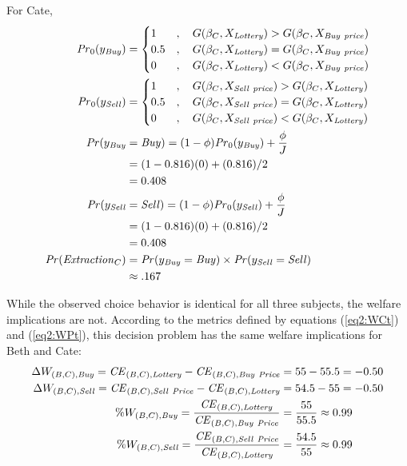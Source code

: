 \documentclass[../main.tex]{subfiles}
\begin{document}
\noindent For Cate,
\begin{align}
	\label{eq2:Cate}
	\begin{split}
		{\ensuremath{\mathit{Pr}}}_0(y_{\mathit{Buy}}) &=
		\begin{cases}
			1 &, \quad G(\beta_C,X_{\mathit{Lottery}}) > G(\beta_C,X_{\mathit{Buy\ price}})\\
			0.5 &, \quad G(\beta_C,X_{\mathit{Lottery}}) = G(\beta_C,X_{\mathit{Buy\ price}})\\
			0 &, \quad G(\beta_C,X_{\mathit{Lottery}}) < G(\beta_C,X_{\mathit{Buy\ price}})
		\end{cases} \\
		{\mathit{Pr}}_0(y_{\mathit{Sell}}) &=
		\begin{cases}
			1 &, \quad G(\beta_C,X_{\mathit{Sell\ price}}) > G(\beta_C,X_{\mathit{Lottery}})\\
			0.5 &, \quad G(\beta_C,X_{\mathit{Sell\ price}}) = G(\beta_C,X_{\mathit{Lottery}})\\
			0 &, \quad G(\beta_C,X_{\mathit{Sell\ price}}) < G(\beta_C,X_{\mathit{Lottery}})
		\end{cases}\\
		{\mathit{Pr}}(y_{\mathit{Buy}}&=\mathit{Buy}) = (1-\phi) {\mathit{Pr}}_0(y_{\mathit{Buy}}) + \frac{\phi}{J}\\
		&=(1-0.816)(0) + (0.816)/2\\
		&=0.408\\
		{\mathit{Pr}}(y_{\mathit{Sell}}&=\mathit{Sell}) = (1-\phi) {\mathit{Pr}}_0(y_{\mathit{Sell}}) + \frac{\phi}{J}\\
		&=(1-0.816)(0) + (0.816)/2\\
		&=0.408\\
	{\mathit{Pr}}(\mathit{Extraction}_C) &= {\mathit{Pr}}(y_{\mathit{Buy}} = \mathit{Buy}) \times {\ensuremath{\mathit{Pr}}}(y_{\mathit{Sell}} = \mathit{Sell})\\
	&\approx .167
	\end{split}
\end{align}

While the observed choice behavior is identical for all three subjects, the welfare implications are not.
According to the metrics defined by equations (\ref{eq2:WCt}) and (\ref{eq2:WPt}), this decision problem has the same welfare implications for Beth and Cate:
\begin{align}
	\label{eq2:BCwelfare}
	\begin{split}
		\Delta W_{(B,C),\mathit{Buy}} = {\mathit{CE}}_{(B,C),\mathit{Lottery}} - {\mathit{CE}}_{(B,C),\mathit{Buy\ Price}} &= 55 - 55.5 = -0.50\\
		\Delta W_{(B,C),\mathit{Sell}} = {\mathit{CE}}_{(B,C),\mathit{Sell\ Price}} - {\mathit{CE}}_{(B,C),\mathit{Lottery}} &= 54.5 - 55 = -0.50\\
		\% W_{(B,C),\mathit{Buy}} = \frac{{\mathit{CE}}_{(B,C),\mathit{Lottery}}}{{\mathit{CE}}_{(B,C),\mathit{Buy\ Price}}} &= \frac{55}{55.5} \approx 0.99\\
		\% W_{(B,C),\mathit{Sell}} = \frac{{\mathit{CE}}_{(B,C),\mathit{Sell\ Price}}}{{\mathit{CE}}_{(B,C),\mathit{Lottery}}} &= \frac{54.5}{55} \approx 0.99
	\end{split}
\end{align}
\end{document}
